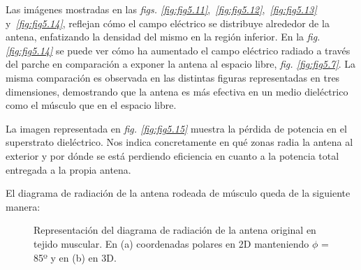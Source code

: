 \newpage

Las imágenes mostradas en las \textit{figs. \ref{fig:fig5.11}},~\textit{\ref{fig:fig5.12}},~\textit{\ref{fig:fig5.13}} y~\textit{\ref{fig:fig5.14}}, reflejan cómo el campo eléctrico se distribuye alrededor de la antena, enfatizando la densidad del mismo en la región inferior. En la \textit{fig. \ref{fig:fig5.14}} se puede ver cómo ha aumentado el campo eléctrico radiado a través del parche en comparación a exponer la antena al espacio libre, \textit{fig. \ref{fig:fig5.7}}. La misma comparación es observada en las distintas figuras representadas en tres dimensiones, demostrando que la antena es más efectiva en un medio dieléctrico como el músculo que en el espacio libre.

La imagen representada en \textit{fig. \ref{fig:fig5.15}} muestra la pérdida de potencia en el superstrato dieléctrico. Nos indica concretamente en qué zonas radia la antena al exterior y por dónde se está perdiendo eficiencia en cuanto a la potencia total entregada a la propia antena.

El diagrama de radiación de la antena rodeada de músculo queda de la siguiente manera:

\begin{figure}[!htb]
    \centering
    \caption{Representación del diagrama de radiación de la antena original en tejido muscular. En (a) coordenadas polares en 2D manteniendo $\phi$ = 85º y en (b) en 3D.}
    \label{fig:fig5.16}
\end{figure}

